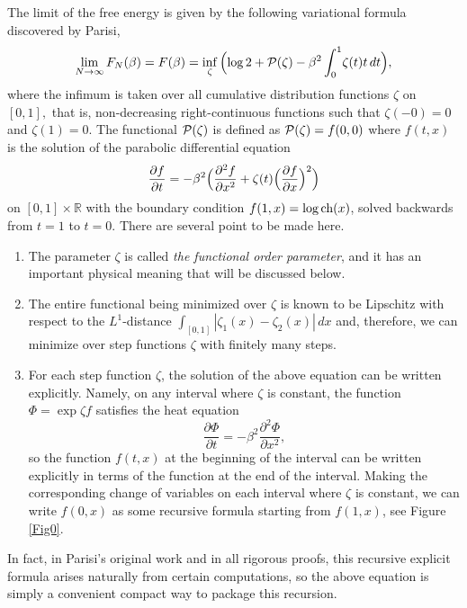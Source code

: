 \documentclass[12pt]{article}
\newcommand{\PP}{{\cal P}}
\newcommand{\ch}{{\mbox{\rm ch}}}
\newcommand{\Reals}{\mathbb{R}}
\theoremstyle{nonumberplain}
\begin{document}
\medskip
\noindent
The limit of the free energy is given by the following variational formula discovered by Parisi,
\begin{equation}
 \lim_{N\to\infty} F_N(\beta) = F(\beta) = \inf_{\zeta}\, \Bigl(\log 2 + \PP(\zeta) -{\beta^2}\int_{0}^{1}\! \zeta(t)t\, dt\Bigr),
\label{ch30Parisi}
\end{equation}
where the infimum is taken over all cumulative distribution functions $\zeta$ on $[0,1],$  that is, non-decreasing right-continuous functions such that $\zeta(-0)=0$ and $\zeta(1)=0$. The functional $\PP(\zeta)$ is defined as $\PP(\zeta) = f(0,0)$ where $f(t,x)$ is the solution of the parabolic differential equation
\begin{equation}
\frac{\partial f}{\partial t} = -\beta^2\Bigl(
\frac{\partial^2 f}{\partial x^2} + \zeta(t)
\Bigl(\frac{\partial f}{\partial x}\Bigr)^2
\Bigr)
\label{ParisiEq}
\end{equation}
on $[0,1]\times \Reals$ with the boundary condition $f(1,x) = \log \ch(x)$, solved backwards from $t=1$ to $t=0.$ There are several point to be made here.
\begin{enumerate}
\item The parameter $\zeta$ is called \emph{the functional order parameter}, and it has an important physical meaning that will be discussed below.

\item The entire functional being minimized over $\zeta$ is known to be Lipschitz with respect to the $L^1$-distance $\int_{[0,1]} |\zeta_1(x) - \zeta_2(x)|\,dx$ and, therefore, we can minimize over step functions $\zeta$ with finitely many steps.

\item For each step function $\zeta$, the solution of the above equation can be written explicitly. Namely, on any interval where $\zeta$ is constant, the function $\Phi= \exp \zeta f$ satisfies the heat equation 
$$
\frac{\partial \Phi}{\partial t} = - \beta^2 \frac{\partial^2 \Phi}{\partial x^2},
$$
so the function $f(t,x)$ at the beginning of the interval can be written explicitly in terms of the function at the end of the interval. Making the corresponding change of variables on each interval where $\zeta$ is constant, we can write $f(0,x)$ as some recursive formula starting from $f(1,x)$, see Figure \ref{Fig0}.
\end{enumerate}
In fact, in Parisi's original work and in all rigorous proofs, this recursive explicit formula arises naturally from certain computations, so the above equation is simply a convenient compact way to package this recursion. 
\end{document}
